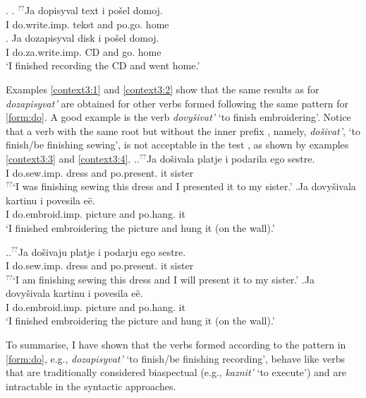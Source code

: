 \ex.\label{context2} \ag. \label{context1:2}$^{??}$Ja dopisyval text i po\v{s}el\textsuperscript{\PF} domoj.\\
{}I do.write.imp. tekst and po.go. home\\
\bg. \label{context2:2}Ja dozapisyval disk i po\v{s}el\textsuperscript{\PF} domoj.\\
I do.za.write.imp. CD and go. home\\
\trans `I finished recording the CD and went home.'

Examples \ref{context3:1} and \ref{context3:2} show that the same results as for \textit{dozapisyvat'} are obtained for other verbs formed following the same pattern for  \ref{form:do}. A good example is the verb \textit{dovy\v{s}ivat'} `to finish embroidering'. Notice that a verb with the same root but without the inner prefix , namely, \textit{do\v{s}ivat'}, `to finish/be finishing sewing', is not acceptable in the test , as shown by examples \ref{context3:3} and \ref{context3:4}.
\ex.\label{context3}\ag.\label{context3:3}$^{??}$Ja do\v{s}ivala platje i podarila\textsuperscript{\PF} ego sestre.\\
{}I do.sew.imp. dress and po.present. it sister\\
$^{??}$`I was finishing sewing this dress and I presented it to my sister.'
\bg.\label{context3:1}Ja dovy\v{s}ivala kartinu i povesila\textsuperscript{\PF} e\"e.\\
I do.embroid.imp. picture and po.hang. it\\
\trans `I finished embroidering the picture and hung it (on the wall).'

\ex.\label{context31}\ag.\label{context3:4}$^{??}$Ja do\v{s}ivaju platje i podarju\textsuperscript{\PF} ego sestre.\\
{}I do.sew.imp. dress and po.present. it sister\\
$^{??}$`I am finishing sewing this dress and I will present it to my sister.'
\bg.\label{context3:2}Ja dovy\v{s}ivala kartinu i povesila\textsuperscript{\PF} e\"e.\\
I do.embroid.imp. picture and po.hang. it\\
\trans `I finished embroidering the picture and hung it (on the wall).'

To summarise, I have shown that the verbs formed according to the pattern in \ref{form:do}, e.g., \textit{dozapisyvat'} `to finish/be finishing recording', behave like verbs that are traditionally considered biaspectual (e.g., \textit{kaznit'} `to execute') and are intractable in the syntactic approaches.

